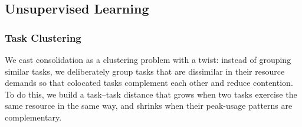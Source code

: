 \subsection{Unsupervised Learning}
\label{sec:unsupervised_learning}
\subsubsection{Task Clustering}
\label{sec:task_clustering}
We cast consolidation as a clustering problem with a twist: instead of grouping similar tasks, we deliberately group tasks that are dissimilar in their resource demands so that colocated tasks complement each other and reduce contention. To do this, we build a task–task distance that grows when two tasks exercise the same resource in the same way, and shrinks when their peak-usage patterns are complementary.

